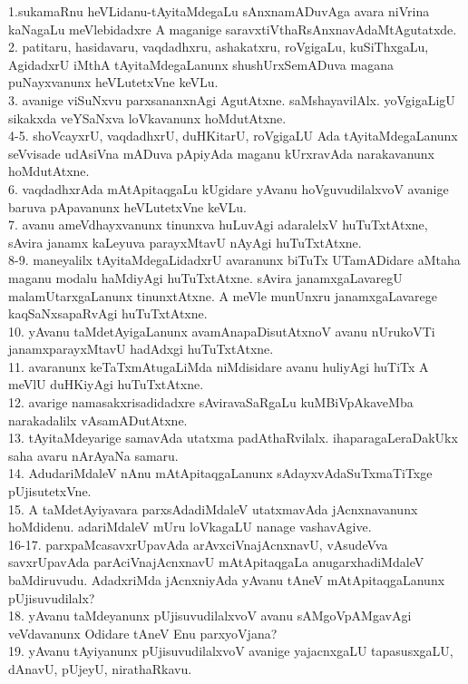 \documentclass{article}
\begin{document}
1.sukamaRnu heVLidanu-tAyitaMdegaLu sAnxnamADuvAga avara niVrina kaNagaLu meVlebidadxre A maganige saravxtiVthaRsAnxnavAdaMtAgutatxde.\\
2. patitaru, hasidavaru, vaqdadhxru, ashakatxru, roVgigaLu, kuSiThxgaLu, AgidadxrU iMthA tAyitaMdegaLanunx shushUrxSemADuva magana puNayxvanunx heVLutetxVne keVLu.\\
3. avanige viSuNxvu parxsananxnAgi AgutAtxne. saMshayavilAlx. yoVgigaLigU sikakxda veYSaNxva loVkavanunx hoMdutAtxne.\\
4-5. shoVcayxrU, vaqdadhxrU, duHKitarU, roVgigaLU Ada tAyitaMdegaLanunx seVvisade udAsiVna mADuva pApiyAda maganu kUrxravAda narakavanunx hoMdutAtxne.\\
6. vaqdadhxrAda mAtApitaqgaLu kUgidare yAvanu hoVguvudilalxvoV avanige baruva pApavanunx heVLutetxVne keVLu.\\
7. avanu ameVdhayxvanunx tinunxva huLuvAgi adaralelxV huTuTxtAtxne, sAvira janamx kaLeyuva parayxMtavU nAyAgi huTuTxtAtxne.\\
8-9. maneyalilx tAyitaMdegaLidadxrU avaranunx biTuTx UTamADidare aMtaha maganu modalu haMdiyAgi huTuTxtAtxne. sAvira janamxgaLavaregU malamUtarxgaLanunx tinunxtAtxne. A meVle munUnxru janamxgaLavarege kaqSaNxsapaRvAgi huTuTxtAtxne.\\
10. yAvanu taMdetAyigaLanunx avamAnapaDisutAtxnoV avanu nUrukoVTi janamxparayxMtavU hadAdxgi huTuTxtAtxne.\\
11. avaranunx keTaTxmAtugaLiMda niMdisidare avanu huliyAgi huTiTx A meVlU duHKiyAgi huTuTxtAtxne.\\
12. avarige namasakxrisadidadxre sAviravaSaRgaLu kuMBiVpAkaveMba narakadalilx vAsamADutAtxne.\\
13. tAyitaMdeyarige samavAda utatxma padAthaRvilalx. ihaparagaLeraDakUkx saha avaru nArAyaNa samaru.\\
14. AdudariMdaleV nAnu mAtApitaqgaLanunx sAdayxvAdaSuTxmaTiTxge pUjisutetxVne.\\
15. A taMdetAyiyavara parxsAdadiMdaleV utatxmavAda jAcnxnavanunx hoMdidenu. adariMdaleV mUru loVkagaLU nanage vashavAgive.\\
16-17. parxpaMcasavxrUpavAda arAvxciVnajAcnxnavU, vAsudeVva savxrUpavAda parAciVnajAcnxnavU mAtApitaqgaLa anugarxhadiMdaleV baMdiruvudu. AdadxriMda jAcnxniyAda yAvanu tAneV mAtApitaqgaLanunx pUjisuvudilalx?\\
18. yAvanu taMdeyanunx pUjisuvudilalxvoV avanu sAMgoVpAMgavAgi veVdavanunx Odidare tAneV Enu parxyoVjana?\\
19. yAvanu tAyiyanunx pUjisuvudilalxvoV avanige yajacnxgaLU tapasusxgaLU, dAnavU, pUjeyU, nirathaRkavu.\\
\end{document}
